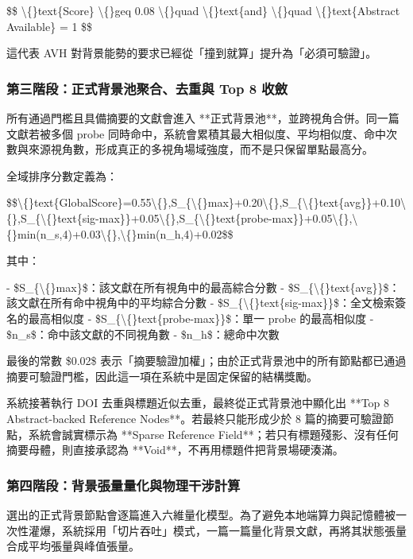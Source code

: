 \documentclass{article}
\begin{document}
\$\$
\textbackslash\{\}text\{Score\} \textbackslash\{\}geq 0.08
\textbackslash\{\}quad \textbackslash\{\}text\{and\} \textbackslash\{\}quad
\textbackslash\{\}text\{Abstract Available\} = 1
\$\$

這代表 AVH 對背景能勢的要求已經從「撞到就算」提升為「必須可驗證」。

\subsubsection{第三階段：正式背景池聚合、去重與 Top 8 收斂}

所有通過門檻且具備摘要的文獻會進入 **正式背景池**，並跨視角合併。同一篇文獻若被多個 probe 同時命中，系統會累積其最大相似度、平均相似度、命中次數與來源視角數，形成真正的多視角場域強度，而不是只保留單點最高分。

全域排序分數定義為：

\$\$\textbackslash\{\}text\{GlobalScore\}=0.55\textbackslash\{\},S\_\{\textbackslash\{\}max\}+0.20\textbackslash\{\},S\_\{\textbackslash\{\}text\{avg\}\}+0.10\textbackslash\{\},S\_\{\textbackslash\{\}text\{sig-max\}\}+0.05\textbackslash\{\},S\_\{\textbackslash\{\}text\{probe-max\}\}+0.05\textbackslash\{\},\textbackslash\{\}min(n\_s,4)+0.03\textbackslash\{\},\textbackslash\{\}min(n\_h,4)+0.02\$\$

其中：

- \$S\_\{\textbackslash\{\}max\}\$：該文獻在所有視角中的最高綜合分數  
- \$S\_\{\textbackslash\{\}text\{avg\}\}\$：該文獻在所有命中視角中的平均綜合分數  
- \$S\_\{\textbackslash\{\}text\{sig-max\}\}\$：全文檢索簽名的最高相似度  
- \$S\_\{\textbackslash\{\}text\{probe-max\}\}\$：單一 probe 的最高相似度  
- \$n\_s\$：命中該文獻的不同視角數  
- \$n\_h\$：總命中次數  

最後的常數 \$0.02\$ 表示「摘要驗證加權」；由於正式背景池中的所有節點都已通過摘要可驗證門檻，因此這一項在系統中是固定保留的結構獎勵。

系統接著執行 DOI 去重與標題近似去重，最終從正式背景池中顯化出 **Top 8 Abstract-backed Reference Nodes**。若最終只能形成少於 8 篇的摘要可驗證節點，系統會誠實標示為 **Sparse Reference Field**；若只有標題殘影、沒有任何摘要母體，則直接承認為 **Void**，不再用標題件把背景場硬湊滿。

\subsubsection{第四階段：背景張量量化與物理干涉計算}

選出的正式背景節點會逐篇進入六維量化模型。為了避免本地端算力與記憶體被一次性灌爆，系統採用「切片吞吐」模式，一篇一篇量化背景文獻，再將其狀態張量合成平均張量與峰值張量。
\end{document}
